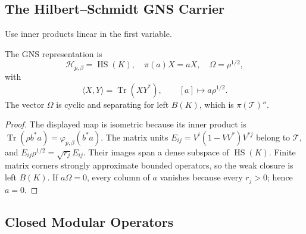 \subsection{The Hilbert--Schmidt GNS Carrier}
\label{v4-arith:kms-gns:cycle1:GNS}

Use inner products linear in the first variable.
\begin{lemma}
\label{v4-arith:kms-gns:lem:GNS-space}
The GNS representation is
\begin{equation}
\label{v4-arith:kms-gns:eq:GNS-iso}
\mathcal H_{p,\beta}=\operatorname{HS}(K),\quad
\pi(a)X=aX,\quad \Omega=\rho^{1/2},
\end{equation}
with
\begin{equation}
\label{v4-arith:kms-gns:eq:GNS-inner-product}
\langle X,Y\rangle=\operatorname{Tr}(XY^*),\qquad
[a]\longmapsto a\rho^{1/2}.
\end{equation}
The vector \(\Omega\) is cyclic and separating for left \(B(K)\),
which is \(\pi(\mathcal T)''\).
\end{lemma}
\begin{proof}
The displayed map is isometric because its inner product is
\(\operatorname{Tr}(\rho b^*a)=\varphi_{p,\beta}(b^*a)\).
The matrix units \(E_{ij}=V^i(1-VV^*)V^{*j}\) belong to
\(\mathcal T\), and \(E_{ij}\rho^{1/2}=\sqrt{r_j}E_{ij}\).
Their images span a dense subspace of \(\operatorname{HS}(K)\).
Finite matrix corners strongly approximate bounded operators,
so the weak closure is left \(B(K)\). If \(a\Omega=0\), every
column of \(a\) vanishes because every \(r_j>0\); hence \(a=0\).
\end{proof}

\subsection{Closed Modular Operators}
\label{v4-arith:kms-gns:cycle1:modular}

